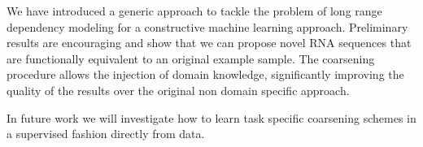 \documentclass[a4paper]{esannV2}
\begin{document}
We have introduced a generic approach to tackle the problem of long range
dependency modeling for a constructive machine learning approach.
Preliminary results are encouraging and show that we can propose novel
RNA sequences that are functionally equivalent to an original example sample.
The coarsening procedure allows the injection of domain knowledge,
significantly improving the quality of the results over the original non domain
specific approach. 

In future work we will investigate how to learn task
specific coarsening schemes in a supervised fashion directly from data.




\begin{footnotesize}




\end{footnotesize}

\end{document}
